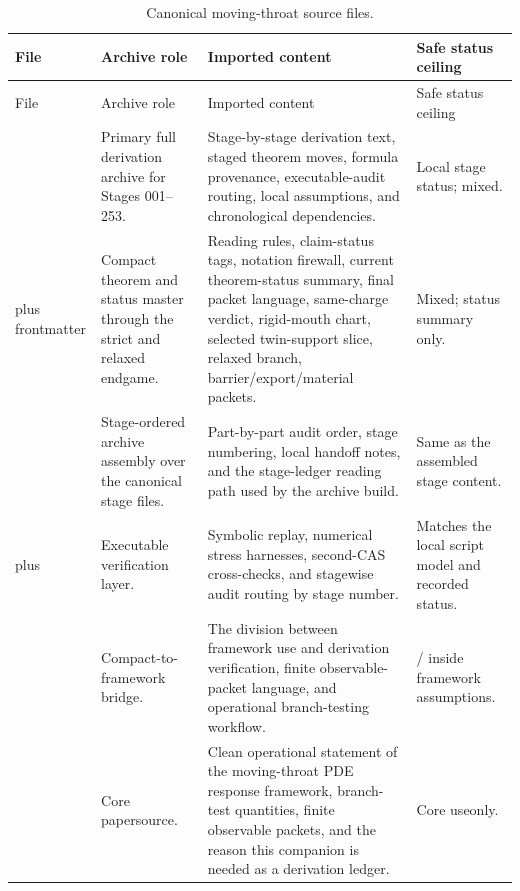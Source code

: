 \begin{longtable}{@{}L{0.28\textwidth}L{0.25\textwidth}L{0.31\textwidth}L{0.10\textwidth}@{}}
\caption{Canonical moving-throat source files.}\label{tab:canonical-moving-throat-source-files}\\
\toprule
File & Archive role & Imported content & Safe status ceiling \\
\midrule
\endfirsthead
\toprule
File & Archive role & Imported content & Safe status ceiling \\
\midrule
\endhead
{} & Primary full derivation archive for Stages 001--253. & Stage-by-stage derivation text, staged theorem moves, formula provenance, executable-audit routing, local assumptions, and chronological dependencies. & Local stage status; mixed. \\
\addlinespace
{} plus frontmatter & Compact theorem and status master through the strict and relaxed endgame. & Reading rules, claim-status tags, notation firewall, current theorem-status summary, final packet language, same-charge verdict, rigid-mouth chart, selected twin-support slice, relaxed branch, barrier/export/material packets. & Mixed; status summary only. \\
\addlinespace
{} & Stage-ordered archive assembly over the canonical stage files. & Part-by-part audit order, stage numbering, local handoff notes, and the stage-ledger reading path used by the archive build. & Same as the assembled stage content. \\
\addlinespace
{} plus  & Executable verification layer. & Symbolic replay, numerical stress harnesses, second-CAS cross-checks, and stagewise audit routing by stage number. & Matches the local script model and recorded status. \\
\addlinespace
{} & Compact-to-framework bridge. & The division between framework use and derivation verification, finite observable-packet language, and operational branch-testing workflow. & \StatusReduced{} / \StatusExactClosure{} inside framework assumptions. \\
\addlinespace
{} & Core paper\newline source. & Clean operational statement of the moving-throat PDE response framework, branch-test quantities, finite observable packets, and the reason this companion is needed as a derivation ledger. & Core use\newline only. \\
\bottomrule
\end{longtable}

